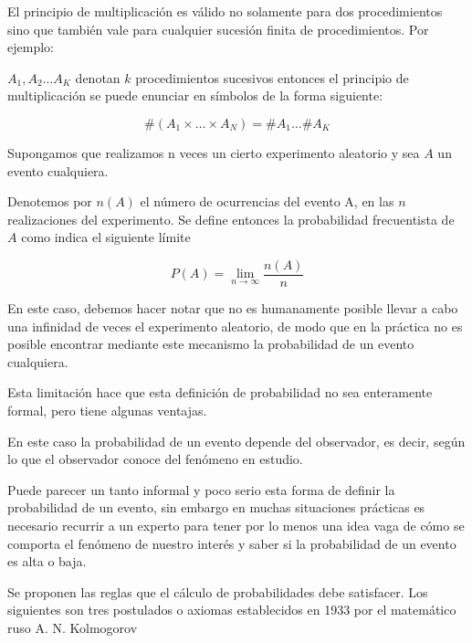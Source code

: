 El principio de multiplicación es válido no solamente para
dos procedimientos sino que también vale para cualquier
sucesión finita de procedimientos. Por ejemplo:

$A_1,A_2\dots A_K$ denotan $k$ procedimientos sucesivos
entonces el principio de multiplicación se puede enunciar
en símbolos de la forma siguiente:


\begin{equation*}
    \# (A_1\times \dots \times A_N)=\# A_1\dots \# A_K
\end{equation*}

\begin{definition}
    Supongamos que realizamos n veces un cierto experimento
    aleatorio y sea $A$ un evento cualquiera.

    Denotemos por $n(A)$ el número de ocurrencias del evento A,
    en las $n$ realizaciones del experimento. Se define entonces la
    probabilidad frecuentista de $A$ como indica el siguiente límite
\end{definition}
\begin{equation}
    P(A)=\lim_{n\to \infty} \frac{n(A)}{n}
\end{equation}

En este caso, debemos hacer notar que no es humanamente
posible llevar a cabo una infinidad de veces el experimento
aleatorio, de modo que en la práctica no es posible encontrar
mediante este mecanismo la probabilidad de un evento
cualquiera.

Esta limitación hace que esta definición de probabilidad no
sea enteramente formal, pero tiene algunas ventajas.

\begin{definition}
    En este caso la probabilidad de un evento depende del
    observador, es decir, según lo que el observador conoce
    del fenómeno en estudio.
\end{definition}

Puede parecer un tanto informal y poco serio esta forma
de definir la probabilidad de un evento, sin embargo en
muchas situaciones prácticas es necesario recurrir a un
experto para tener por lo menos una idea vaga de cómo
se comporta el fenómeno de nuestro interés y saber si la
probabilidad de un evento es alta o baja.


\begin{definition}
    Se proponen las reglas que el cálculo de
    probabilidades debe satisfacer. Los siguientes son tres
    postulados o axiomas establecidos en 1933 por el
    matemático ruso A. N. Kolmogorov
\end{definition}


